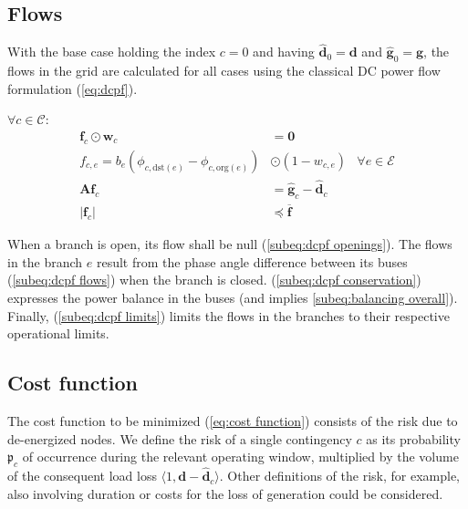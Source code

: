 \subsection{Flows}
\label{ss:dcpf} With the base case holding the index $c=0$ and having $\pmb{\hat{d}}
_{0}=\pmb{d}$ and $\pmb{\hat{g}}_{0}=\pmb{g}$, the flows in the grid are
calculated for all cases using the classical DC power flow formulation (\ref{eq:dcpf}).

$\forall c \in \mathcal{C}$:
\begin{subequations}
    \begin{align}
        \pmb{f}_{c}\odot \pmb{w}_{c}                                              & = \pmb{0}\label{subeq:dcpf openings}                                  \\
        f_{c,e}= b_{e}\left(\phi_{c,\text{dst}(e)}- \phi_{c,\text{org}(e)}\right) & \odot (1-w_{c,e})                                                      & \forall e \in \mathcal{E}\label{subeq:dcpf flows} \\
        \pmb{A}\pmb{f}_{c}                                                        & = \pmb{\hat{g}}_{c}- \pmb{\hat{d}}_{c}\label{subeq:dcpf conservation} \\
        \left|\pmb{f}_{c}\right|                                                  & \preceq \overline{\pmb{f}}\label{subeq:dcpf limits}
    \end{align}
    \label{eq:dcpf}
\end{subequations}

When a branch is open, its flow shall be null (\ref{subeq:dcpf
openings}). The flows in the branch $e$ result from the phase angle difference between
its buses (\ref{subeq:dcpf flows}) when the branch is closed. (\ref{subeq:dcpf
conservation}) expresses the power balance in the buses (and implies \eqref{subeq:balancing overall}). Finally, (\ref{subeq:dcpf
limits}) limits the flows in the branches to their respective operational limits.

\subsection{Cost function}
\label{ss:cost function} The cost function to be minimized (\ref{eq:cost
function}) consists of the risk due to de-energized nodes. We define the risk of a single contingency $c$ as its probability $\mathfrak{p}_{c}$ of occurrence during the relevant operating window, multiplied
by the volume of the consequent load loss $\langle 1,\pmb{d}- \hat{\pmb{d}}_{c}\rangle$. Other definitions of the risk, for example, also involving duration or costs for the loss of generation could be considered.

